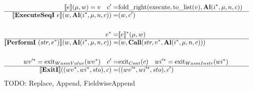\begin{align*}
%
\newline \\
  \sem{e}(\mu, w) = v \quad
  c' =& \text{fold\_right}(\text{execute}, \text{to\_list}(v), \al (\seq{i}, \mu, n, c)) \\
  \hline
  \sem{\executeseqi ~ e}(w, \al (\seq{i}, \mu, n, c))
  =&
  (w, c') \\
%
\newline \\
  \seq v =& \seq{\sem{e}}(\mu, w) \\
  \hline
  \sem{\performi ~ (str, \seq e)}(w, \al (\seq{i}, \mu, n, c))
  =&
  (w, \call (str, \seq v, \al (\seq{i}, \mu, n, c))) \\
%
\newline \\
  \seq{wv'} = \text{exit}_{WasmValue}(\seq{wv}) \quad
  c' =& \text{exit}_{Cont}(c) \quad
  \seq{wi'} = \text{exit}_{WasmInstr}(\seq{wi}) \\
  \hline
  \sem{\exiti}((\seq{wv}, \seq{wi}, sto), c)
  =&
  ((\seq{wv'}, \seq{wi'}, sto), c') \\
\end{align*}
TODO: Replace, Append, FieldwiseAppend

